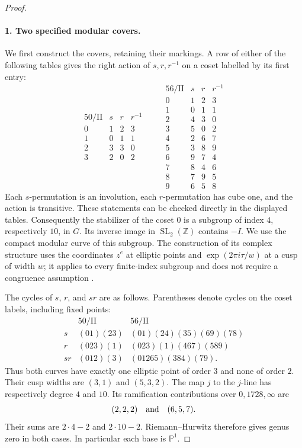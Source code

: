 \begin{proof}
\paragraph{1. Two specified modular covers.}
We first construct the covers, retaining their markings.  A row of
either of the following tables gives the right action of $s,r,r^{-1}$
on a coset labelled by its first entry:
\[
\begin{array}{c|rrr}
50/\mathrm{II}&s&r&r^{-1}\\\hline
0&1&2&3\\1&0&1&1\\2&3&3&0\\3&2&0&2
\end{array}
\qquad
\begin{array}{c|rrr}
56/\mathrm{II}&s&r&r^{-1}\\\hline
0&1&2&3\\1&0&1&1\\2&4&3&0\\3&5&0&2\\
4&2&6&7\\5&3&8&9\\6&9&7&4\\7&8&4&6\\
8&7&9&5\\9&6&5&8
\end{array}
\]
Each $s$-permutation is an involution, each $r$-permutation has cube
one, and the action is transitive.  These statements can be checked
directly in the displayed tables.  Consequently the stabilizer of
the coset $0$ is a subgroup of index $4$, respectively $10$, in $G$.
Its inverse image in $\operatorname{SL}_2(\mathbb Z)$ contains $-I$.
We use the compact modular curve of this subgroup.  The construction
of its complex structure uses the coordinates $z^e$ at elliptic
points and $\exp(2\pi i\tau/w)$ at a cusp of width $w$;
it applies to every finite-index subgroup and does not require a
congruence assumption \cite[pp.~35--38]{mapsMilne2017}.

The cycles of $s$, $r$, and $sr$ are as follows.  Parentheses denote
cycles on the coset labels, including fixed points:
\[
\begin{array}{c|l|l}
&50/\mathrm{II}&56/\mathrm{II}\\\hline
s&(01)(23)&(01)(24)(35)(69)(78)\\
r&(023)(1)&(023)(1)(467)(589)\\
sr&(012)(3)&(01265)(384)(79).
\end{array}
\]
Thus both curves have exactly one elliptic point of order $3$ and
none of order $2$.  Their cusp widths are $(3,1)$ and $(5,3,2)$.
The map $j$ to the $j$-line has respectively degree $4$ and $10$.
Its ramification contributions over $0,1728,\infty$ are
\[
 (2,2,2)\quad\hbox{and}\quad(6,5,7).
\]
Their sums are $2\cdot4-2$ and $2\cdot10-2$.  Riemann--Hurwitz
therefore gives genus zero in both cases.  In particular each base
is $\mathbb P^1$.


\end{proof}
